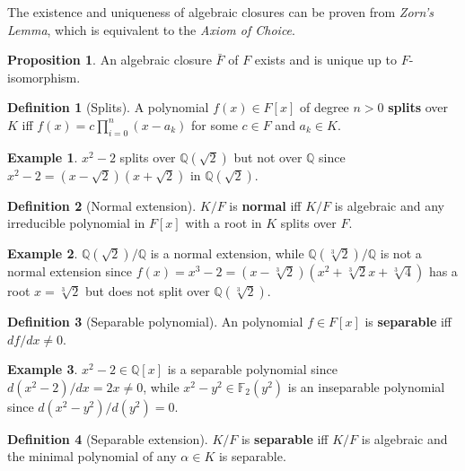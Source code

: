 \documentclass{article}
\newcommand{\F}{\mathbb{F}}
\newcommand{\Q}{\mathbb{Q}}
\newcommand{\rb}[1]{\left( #1 \right)}
\renewcommand{\sb}[1]{\left[ #1 \right]}
\theoremstyle{definition}\newtheorem*{definition}{Definition}
\theoremstyle{definition}\newtheorem*{example}{Example}
\theoremstyle{definition}\newtheorem*{remark}{Remark}
\newtheorem{proposition}{Proposition}[subsection]
\begin{document}
The existence and uniqueness of algebraic closures can be proven from \emph{Zorn's Lemma}, which is equivalent to the \emph{Axiom of Choice}.

\begin{proposition}
An algebraic closure $ \bar{F} $ of $ F $ exists and is unique up to $ F $-isomorphism.
\end{proposition}

\begin{definition}[Splits]
A polynomial $ f\rb{x} \in F\sb{x} $ of degree $ n > 0 $ \textbf{splits} over $ K $ iff $ f\rb{x} = c\prod_{i = 0}^n \rb{x - a_k} $ for some $ c \in F $ and $ a_k \in K $.
\end{definition}

\begin{example}
$ x^2 - 2 $ splits over $ \Q\rb{\sqrt{2}} $ but not over $ \Q $ since $ x^2 - 2 = \rb{x - \sqrt{2}}\rb{x + \sqrt{2}} $ in $ \Q\rb{\sqrt{2}} $.
\end{example}

\begin{definition}[Normal extension]
$ K / F $ is \textbf{normal} iff $ K / F $ is algebraic and any irreducible polynomial in $ F\sb{x} $ with a root in $ K $ splits over $ F $.
\end{definition}

\begin{example}
$ \Q\rb{\sqrt{2}} / \Q $ is a normal extension, while $ \Q\rb{\sqrt[3]{2}} / \Q $ is not a normal extension since $ f\rb{x} = x^3 - 2 = \rb{x - \sqrt[3]{2}} \rb{x^2 + \sqrt[3]{2}x + \sqrt[3]{4}} $ has a root $ x = \sqrt[3]{2} $ but does not split over $ \Q\rb{\sqrt[3]{2}} $.
\end{example}

\begin{definition}[Separable polynomial]
An polynomial $ f \in F\sb{x} $ is \textbf{separable} iff $ df / dx \ne 0 $.
\end{definition}

\begin{example}
$ x^2 - 2 \in \Q\sb{x} $ is a separable polynomial since $ d\rb{x^2 - 2} / dx = 2x \ne 0 $, while $ x^2 - y^2 \in \F_2\rb{y^2} $ is an inseparable polynomial since $ d\rb{x^2 - y^2} / d\rb{y^2} = 0 $.
\end{example}

\begin{definition}[Separable extension]
$ K / F $ is \textbf{separable} iff $ K / F $ is algebraic and the minimal polynomial of any $ \alpha \in K $ is separable.
\end{definition}
\end{document}
